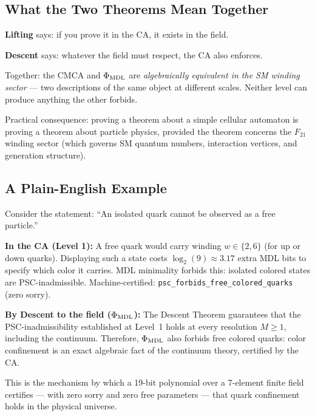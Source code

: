 \documentclass[11pt,a4paper]{article}
\newcommand{\lean}[1]{\texttt{#1}}
\newcommand{\PhiMDL}{\Phi_{\rm MDL}}
\theoremstyle{definition}
\begin{document}
\subsection{What the Two Theorems Mean Together}

\begin{tcolorbox}[colback=boxtan,colframe=orange!50!black,title=The bidirectional bridge]
\textbf{Lifting} says: if you prove it in the CA, it exists in the field.

\textbf{Descent} says: whatever the field must respect, the CA also enforces.

Together: the CMCA and $\PhiMDL$ are \emph{algebraically equivalent in the SM
winding sector} --- two descriptions of the same object at different scales.
Neither level can produce anything the other forbids.

\smallskip
Practical consequence: proving a theorem about a simple cellular automaton
is proving a theorem about particle physics, provided the theorem concerns
the $F_{21}$ winding sector (which governs SM quantum numbers, interaction
vertices, and generation structure).
\end{tcolorbox}

\subsection{A Plain-English Example}

Consider the statement: ``An isolated quark cannot be observed as a free particle.''

\medskip
\noindent
\textbf{In the CA (Level 1):}
A free quark would carry winding $w \in \{2, 6\}$ (for up or down quarks).
Displaying such a state costs $\log_2(9) \approx 3.17$ extra MDL bits to specify
which color it carries.  MDL minimality forbids this: isolated colored states
are PSC-inadmissible.
Machine-certified: \mbox{\lean{psc\_forbids\_free\_colored\_quarks}} (zero sorry).

\medskip
{\sloppy
\noindent
\textbf{By Descent to the field ($\PhiMDL$):}
The Descent Theorem guarantees that the PSC-inadmissibility established at
Level~1 holds at every resolution $M \geq 1$, including the continuum.
Therefore, $\PhiMDL$ also forbids free colored quarks: color confinement is
an exact algebraic fact of the continuum theory, certified by the CA.
\par}

\medskip\noindent
This is the mechanism by which a 19-bit polynomial over a 7-element finite
field certifies --- with zero sorry and zero free parameters --- that
quark confinement holds in the physical universe.
\end{document}
